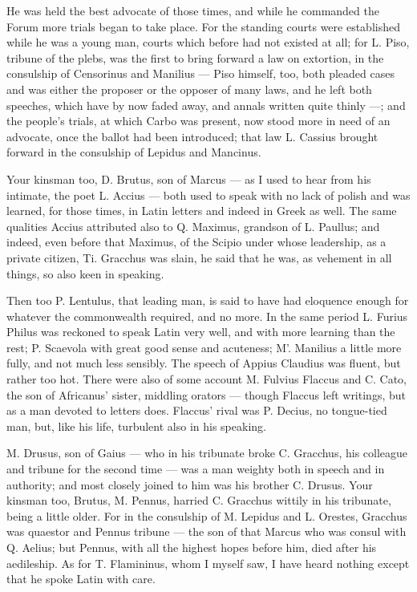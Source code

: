  He was held the best advocate of those times, and while he commanded the Forum more trials began to take place. For the standing courts were established while he was a young man, courts which before had not existed at all; for L. Piso, tribune of the plebs, was the first to bring forward a law on extortion, in the consulship of Censorinus and Manilius — Piso himself, too, both pleaded cases and was either the proposer or the opposer of many laws, and he left both speeches, which have by now faded away, and annals written quite thinly —; and the people's trials, at which Carbo was present, now stood more in need of an advocate, once the ballot had been introduced; that law L. Cassius brought forward in the consulship of Lepidus and Mancinus.

 Your kinsman too, D. Brutus, son of Marcus — as I used to hear from his intimate, the poet L. Accius — both used to speak with no lack of polish and was learned, for those times, in Latin letters and indeed in Greek as well. The same qualities Accius attributed also to Q. Maximus, grandson of L. Paullus; and indeed, even before that Maximus, of the Scipio under whose leadership, as a private citizen, Ti. Gracchus was slain, he said that he was, as vehement in all things, so also keen in speaking.

 Then too P. Lentulus, that leading man, is said to have had eloquence enough for whatever the commonwealth required, and no more. In the same period L. Furius Philus was reckoned to speak Latin very well, and with more learning than the rest; P. Scaevola with great good sense and acuteness; M'. Manilius a little more fully, and not much less sensibly. The speech of Appius Claudius was fluent, but rather too hot. There were also of some account M. Fulvius Flaccus and C. Cato, the son of Africanus' sister, middling orators — though Flaccus left writings, but as a man devoted to letters does. Flaccus' rival was P. Decius, no tongue-tied man, but, like his life, turbulent also in his speaking.

 M. Drusus, son of Gaius — who in his tribunate broke C. Gracchus, his colleague and tribune for the second time — was a man weighty both in speech and in authority; and most closely joined to him was his brother C. Drusus. Your kinsman too, Brutus, M. Pennus, harried C. Gracchus wittily in his tribunate, being a little older. For in the consulship of M. Lepidus and L. Orestes, Gracchus was quaestor and Pennus tribune — the son of that Marcus who was consul with Q. Aelius; but Pennus, with all the highest hopes before him, died after his aedileship. As for T. Flamininus, whom I myself saw, I have heard nothing except that he spoke Latin with care.

